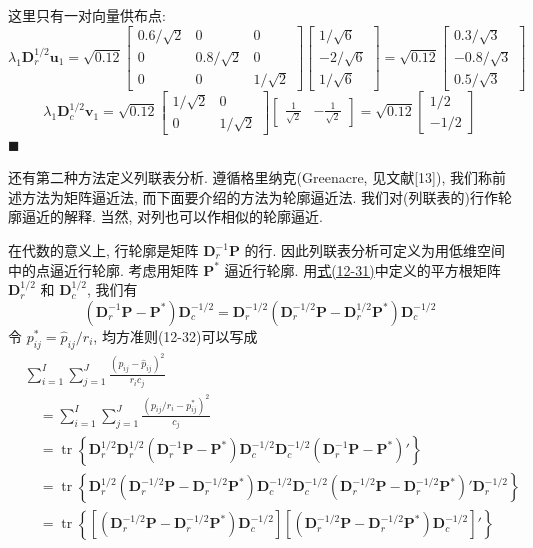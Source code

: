 这里只有一对向量供布点:
\[
\lambda_1\mathbf{D}_r^{1/2}\mathbf{u}_1=\sqrt{0.12}
\begin{bmatrix}0.6/\sqrt{2}&0&0\\0&0.8/\sqrt{2}&0\\0&0&1/\sqrt{2}\end{bmatrix}
\begin{bmatrix}1/\sqrt{6}\\-2/\sqrt{6}\\1/\sqrt{6}\end{bmatrix}
=\sqrt{0.12}\begin{bmatrix}0.3/\sqrt{3}\\-0.8/\sqrt{3}\\0.5/\sqrt{3}\end{bmatrix}
\]
\[
\lambda_1\mathbf{D}_c^{1/2}\mathbf{v}_1=\sqrt{0.12}
\begin{bmatrix}1/\sqrt{2}&0\\0&1/\sqrt{2}\end{bmatrix}
\begin{bmatrix}\frac{1}{\sqrt{2}}&-\frac{1}{\sqrt{2}}\end{bmatrix}
=\sqrt{0.12}\begin{bmatrix}1/2\\-1/2\end{bmatrix}
\]
\hfill$\blacksquare$

还有第二种方法定义列联表分析. 遵循格里纳克(Greenacre, 见文献[13]), 我们称前述方法为矩阵逼近法, 而下面要介绍的方法为轮廓逼近法. 我们对(列联表的)行作轮廓逼近的解释. 当然, 对列也可以作相似的轮廓逼近.

在代数的意义上, 行轮廓是矩阵 $\mathbf{D}_r^{-1}\mathbf{P}$ 的行. 因此列联表分析可定义为用低维空间中的点逼近行轮廓. 考虑用矩阵 $\mathbf{P}^*$ 逼近行轮廓. 用\hyperref[eq:12-31]{式(12-31)}中定义的平方根矩阵 $\mathbf{D}_r^{1/2}$ 和 $\mathbf{D}_c^{1/2}$, 我们有
\[
(\mathbf{D}_r^{-1}\mathbf{P}-\mathbf{P}^*)\mathbf{D}_c^{-1/2}
=\mathbf{D}_r^{-1/2}(\mathbf{D}_r^{-1/2}\mathbf{P}-\mathbf{D}_r^{1/2}\mathbf{P}^*)\mathbf{D}_c^{-1/2}
\]
令 $p_{ij}^*=\hat{p}_{ij}/r_i$, 均方准则(12-32)可以写成
\label{eq:12-39}
\begin{equation}
\begin{aligned}
&\sum_{i=1}^{I}\sum_{j=1}^{J}\frac{(p_{ij}-\hat{p}_{ij})^2}{r_ic_j}\\
&\quad=\sum_{i=1}^{I}\sum_{j=1}^{J}\frac{(p_{ij}/r_i-p_{ij}^*)^2}{c_j}\\
&\quad=\operatorname{tr}\left\{\mathbf{D}_r^{1/2}\mathbf{D}_r^{1/2}(\mathbf{D}_r^{-1}\mathbf{P}-\mathbf{P}^*)
\mathbf{D}_c^{-1/2}\mathbf{D}_c^{-1/2}(\mathbf{D}_r^{-1}\mathbf{P}-\mathbf{P}^*)'\right\}\\
&\quad=\operatorname{tr}\left\{\mathbf{D}_r^{1/2}(\mathbf{D}_r^{-1/2}\mathbf{P}-\mathbf{D}_r^{-1/2}\mathbf{P}^*)
\mathbf{D}_c^{-1/2}\mathbf{D}_c^{-1/2}(\mathbf{D}_r^{-1/2}\mathbf{P}-\mathbf{D}_r^{-1/2}\mathbf{P}^*)'\mathbf{D}_r^{-1/2}\right\}\\
&\quad=\operatorname{tr}\left\{[(\mathbf{D}_r^{-1/2}\mathbf{P}-\mathbf{D}_r^{-1/2}\mathbf{P}^*)\mathbf{D}_c^{-1/2}]
[(\mathbf{D}_r^{-1/2}\mathbf{P}-\mathbf{D}_r^{-1/2}\mathbf{P}^*)\mathbf{D}_c^{-1/2}]'\right\}
\end{aligned}
\tag{12-39}
\end{equation}
